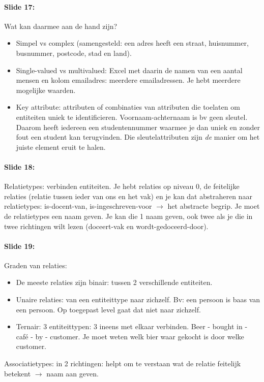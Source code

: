 \documentclass[10pt,a4paper]{report}
\begin{document}
\paragraph{Slide 17:}Wat kan daarmee aan de hand zijn? 
\begin{itemize}
\item Simpel vs complex (samengesteld: een adres heeft een straat, huisnummer, busnummer, postcode, stad en land).
\item Single-valued vs multivalued: Excel met daarin de namen van een aantal mensen en kolom emailadres: meerdere emailadressen. Je hebt meerdere mogelijke waarden.
\item Key attribute: attributen of combinaties van attributen die toelaten om entiteiten uniek te identificieren. Voornaam-achternaam is bv geen sleutel. Daarom heeft iedereen een studentennummer waarmee je dan uniek en zonder fout een student kan terugvinden. Die sleutelattributen zijn \emph{de} manier om het juiste element eruit te halen.
\end{itemize}

\paragraph{Slide 18:}Relatietypes: verbinden entiteiten. Je hebt relaties op niveau 0, de feitelijke relaties (relatie tussen ieder van ons en het vak) en je kan dat abstraheren naar relatietypes: is-docent-van, is-ingeschreven-voor $\rightarrow$ het abstracte begrip. Je moet de relatietypes een naam geven. Je kan die 1 naam geven, ook twee als je die in twee richtingen wilt lezen (doceert-vak en wordt-gedoceerd-door).

\paragraph{Slide 19:}Graden van relaties: 
\begin{itemize}
\item De meeste relaties zijn binair: tussen 2 verschillende entiteiten. 
\item Unaire relaties: van een entiteittype naar zichzelf. Bv: een persoon is baas van een persoon. Op toegepast level gaat dat niet naar zichzelf.
\item Ternair: 3 entiteittypen: 3 ineens met elkaar verbinden. Beer - bought in - café - by - customer. Je moet weten welk bier waar gekocht is door welke customer.
\end{itemize}
Associatietypes: in 2 richtingen: helpt om te verstaan wat de relatie feitelijk betekent $\rightarrow$ naam aan geven.
\end{document}
